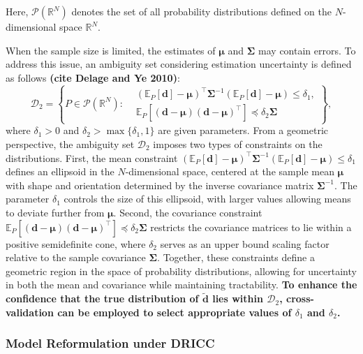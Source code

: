 \documentclass[preprint,12pt,authoryear]{elsarticle}
\begin{document}
Here,
$\mathcal{P}\left(\mathbb{R}^N\right)$
denotes the set of all probability distributions defined on the \(N\)-dimensional space \(\mathbb{R}^N\).

When the sample size is limited, the estimates of $\boldsymbol{\mu}$ and $\boldsymbol{\Sigma}$ may contain errors. To address this issue, an ambiguity set considering estimation uncertainty is defined as follows \textbf{(cite Delage and Ye 2010)}:
\begin{equation}
\mathcal{D}_2 = \left\{ P \in \mathcal{P}(\mathbb{R}^N) :
\begin{aligned}
& (\mathbb{E}_P[\mathbf{d}] - \boldsymbol{\mu})^\top \boldsymbol{\Sigma}^{-1} (\mathbb{E}_P[\mathbf{d}] - \boldsymbol{\mu}) \leqslant \delta_1, \\
& \mathbb{E}_P[(\mathbf{d} - \boldsymbol{\mu})(\mathbf{d} - \boldsymbol{\mu})^\top] \preceq \delta_2 \boldsymbol{\Sigma}
\end{aligned}
\right\},
\end{equation}
where $\delta_1 > 0$ and $\delta_2 > \max\{\delta_1, 1\}$ are given parameters. From a geometric perspective, the ambiguity set $\mathcal{D}_2$ imposes two types of constraints on the distributions. First, the mean constraint $(\mathbb{E}_P[\mathbf{d}] - \boldsymbol{\mu})^\top \boldsymbol{\Sigma}^{-1} (\mathbb{E}_P[\mathbf{d}] - \boldsymbol{\mu}) \leqslant \delta_1$ defines an ellipsoid in the $N$-dimensional space, centered at the sample mean $\boldsymbol{\mu}$ with shape and orientation determined by the inverse covariance matrix $\boldsymbol{\Sigma}^{-1}$. The parameter $\delta_1$ controls the size of this ellipsoid, with larger values allowing means to deviate further from $\boldsymbol{\mu}$. Second, the covariance constraint $\mathbb{E}_P[(\mathbf{d} - \boldsymbol{\mu})(\mathbf{d} - \boldsymbol{\mu})^\top] \preceq \delta_2 \boldsymbol{\Sigma}$ restricts the covariance matrices to lie within a positive semidefinite cone, where $\delta_2$ serves as an upper bound scaling factor relative to the sample covariance $\boldsymbol{\Sigma}$. Together, these constraints define a geometric region in the space of probability distributions, allowing for uncertainty in both the mean and covariance while maintaining tractability. \textbf{To enhance the confidence that the true distribution of $\widetilde{\mathbf{d}}$ lies within $\mathcal{D}_2$, cross-validation can be employed to select appropriate values of $\delta_1$ and $\delta_2$.}

\subsubsection{Model Reformulation under DRICC}
\end{document}
